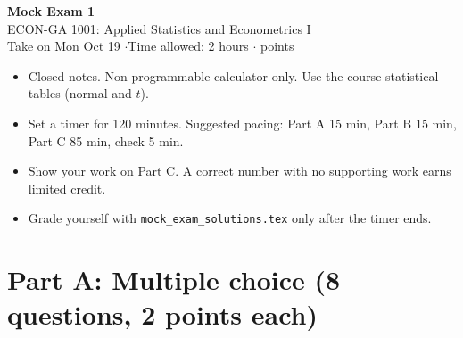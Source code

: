 \documentclass[11pt]{article}
\begin{document}
\begin{center}
{\LARGE\bfseries\color{navy} Mock Exam 1}\\[6pt]
{\large ECON-GA 1001: Applied Statistics and Econometrics I}\\[4pt]
{\color{slate} Take on Mon Oct 19 \quad$\cdot$\quad Time allowed: 2 hours \quad$\cdot$ points}
\end{center}

\begin{planbox}[Instructions]
\begin{itemize}
  \item Closed notes. Non-programmable calculator only. Use the course statistical tables (normal and $t$).
  \item Set a timer for 120 minutes. Suggested pacing: Part A 15 min, Part B 15 min, Part C 85 min, check 5 min.
  \item Show your work on Part C. A correct number with no supporting work earns limited credit.
  \item Grade yourself with \texttt{mock\_exam\_solutions.tex} only after the timer ends.
\end{itemize}
\end{planbox}

\section{Part A: Multiple choice (8 questions, 2 points each)}
\end{document}
